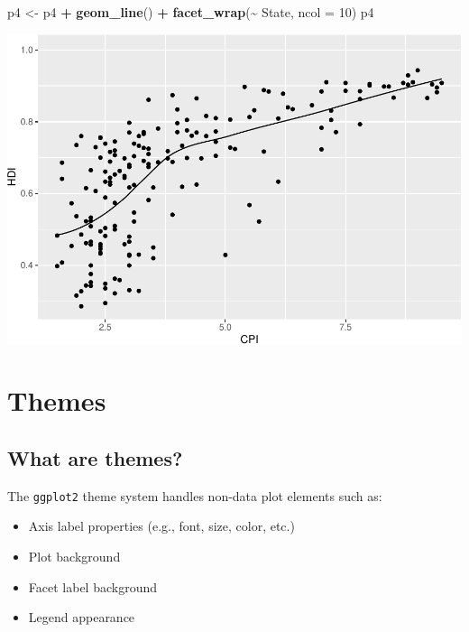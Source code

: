 \documentclass[
]{book}
\newenvironment{Shaded}{\begin{snugshade}}{\end{snugshade}}
\newcommand{\DataTypeTok}[1]{\textcolor[rgb]{0.13,0.29,0.53}{#1}}
\newcommand{\DecValTok}[1]{\textcolor[rgb]{0.00,0.00,0.81}{#1}}
\newcommand{\KeywordTok}[1]{\textcolor[rgb]{0.13,0.29,0.53}{\textbf{#1}}}
\newcommand{\NormalTok}[1]{#1}
\newcommand{\OperatorTok}[1]{\textcolor[rgb]{0.81,0.36,0.00}{\textbf{#1}}}
\newcommand{\StringTok}[1]{\textcolor[rgb]{0.31,0.60,0.02}{#1}}
\providecommand{\tightlist}{%
  \setlength{\itemsep}{0pt}\setlength{\parskip}{0pt}}
\begin{document}
\begin{Shaded}
\begin{Highlighting}[]
\NormalTok{p4 \textless{}{-}}\StringTok{ }\NormalTok{p4 }\OperatorTok{+}\StringTok{ }\KeywordTok{geom\_line}\NormalTok{() }\OperatorTok{+}
\StringTok{   }\KeywordTok{facet\_wrap}\NormalTok{(}\OperatorTok{\textasciitilde{}}\StringTok{ }\NormalTok{State, }\DataTypeTok{ncol =} \DecValTok{10}\NormalTok{)}
\NormalTok{p4}
\end{Highlighting}
\end{Shaded}

\includegraphics{R/Rgraphics/figures/unnamed-chunk-206-1.pdf}

\hypertarget{themes}{%
\section{Themes}\label{themes}}

\hypertarget{what-are-themes}{%
\subsection{What are themes?}\label{what-are-themes}}

The \texttt{ggplot2} theme system handles non-data plot elements such as:

\begin{itemize}
\tightlist
\item
  Axis label properties (e.g., font, size, color, etc.)
\item
  Plot background
\item
  Facet label background
\item
  Legend appearance
\end{itemize}
\end{document}
